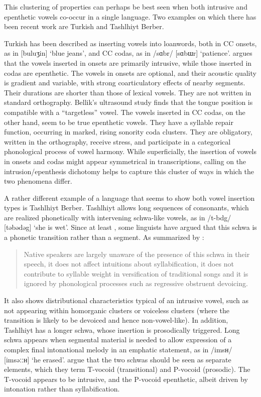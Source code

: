 \documentclass[output=paper,colorlinks,citecolor=brown]{langscibook}
\begin{document}
This clustering of properties can perhaps be best seen when both intrusive and epenthetic vowels co-occur in a single language. Two examples on which there has been recent work are Turkish and Tashlhiyt Berber.  

Turkish has been described as inserting vowels into loanwords, both in CC onsets, as in [buluʒin] ‘blue jeans’, and CC codas, as in
/sɑbr/ [sɑbɯr] ‘patience’. \citet{Bellik2019a} argues that the vowels inserted in onsets are primarily intrusive, while those inserted in codas are epenthetic. The vowels in onsets are optional, and their acoustic quality is gradient and variable, with strong coarticulatory effects of nearby segments. Their durations are shorter than those of lexical vowels. They are not written in standard orthography. Bellik’s ultrasound study finds that the tongue position is compatible with a “targetless” vowel. The vowels inserted in CC codas, on the other hand, seem to be true epenthetic vowels. They have a syllable repair function, occurring in marked, rising sonority coda clusters. They are obligatory, written in the orthography, receive stress, and participate in a categorical phonological process of vowel harmony. While superficially, the insertion of vowels in onsets and codas might appear symmetrical in transcriptions, calling on the intrusion\slash epenthesis dichotomy helps to capture this cluster of ways in which the two phenomena differ.

A rather different example of a language that seems to show both vowel insertion types is Tashlhiyt Berber. Tashlhiyt allows long sequences of consonants, which are realized phonetically with intervening schwa-like vowels, as in /t-bdg/ [təbədəg] ‘she is wet’. Since at least \citet{dell1985syllabic}, some linguists have argued that this schwa is a phonetic transition rather than a segment. As summarized by \citet[434]{ridouane2019story}: 

\begin{quote}
Native speakers are largely unaware of the presence of this schwa in their speech, it does not affect intuitions about syllabification, it does not contribute to syllable weight in versification of traditional songs and it is ignored by phonological processes such as regressive obstruent devoicing.
\end{quote}

It also shows distributional characteristics typical of an intrusive vowel, such as not appearing within homorganic clusters or voiceless clusters (where the transition is likely to be devoiced and hence non-vowel-like). In addition, Tashlhiyt has a longer schwa, whose insertion is prosodically triggered. Long schwa appears when segmental material is needed to allow expression of a complex final intonational melody in an emphatic statement, as in /imsʜ/ [imsəːːʜ] ‘he erased’. \citet{ridouane2019story} argue that the two schwas should be seen as separate elements, which they term T-vocoid (transitional) and P-vocoid (prosodic). The T-vocoid appears to be intrusive, and the P-vocoid epenthetic, albeit driven by intonation rather than syllabification.
\end{document}
